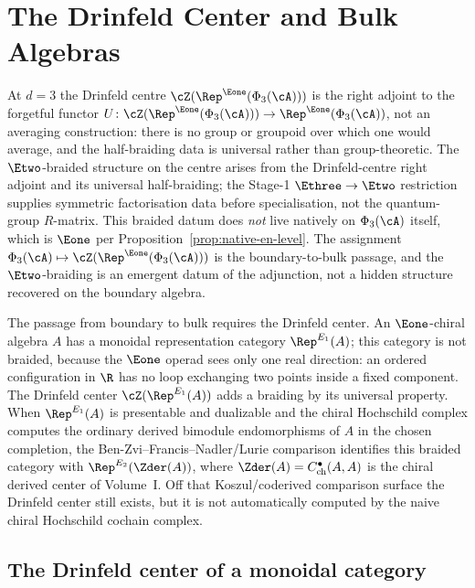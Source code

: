 \chapter{The Drinfeld Center and Bulk Algebras}
\label{ch:drinfeld-center}

\begin{remark}[Drinfeld centre at \texorpdfstring{$d=3$}{d=3}: right adjoint, not averaging]
\label{rem:drinfeld-centre-right-adjoint-not-averaging}
At $d = 3$ the Drinfeld centre $\cZ(\Rep^{\Eone}(\Phi_3(\cA)))$ is the right
adjoint to the forgetful functor
$U \colon \cZ(\Rep^{\Eone}(\Phi_3(\cA))) \to \Rep^{\Eone}(\Phi_3(\cA))$, not an
averaging construction: there is no group or groupoid over which one
would average, and the half-braiding data is universal rather than
group-theoretic. The $\Etwo$-braided structure on the centre arises
from the Drinfeld-centre right adjoint and its universal half-braiding;
the Stage-1 $\Ethree\to\Etwo$ restriction supplies symmetric
factorisation data before specialisation, not the quantum-group
$R$-matrix. This braided datum does \emph{not} live natively on $\Phi_3(\cA)$ itself,
which is $\Eone$ per Proposition~\ref{prop:native-en-level}. The
assignment $\Phi_3(\cA) \mapsto \cZ(\Rep^{\Eone}(\Phi_3(\cA)))$ is the
boundary-to-bulk passage, and the $\Etwo$-braiding is an emergent
datum of the adjunction, not a hidden structure recovered on the
boundary algebra.
\end{remark}

The passage from boundary to bulk requires the Drinfeld center.
An $\Eone$-chiral algebra $A$ has a monoidal representation category
$\Rep^{E_1}(A)$; this category is not braided, because the $\Eone$
operad sees only one real direction: an ordered configuration in
$\R$ has no loop exchanging two points inside a fixed component. The
Drinfeld center $\cZ(\Rep^{E_1}(A))$
adds a braiding by its universal property. When $\Rep^{E_1}(A)$ is presentable
and dualizable and the chiral Hochschild complex computes the
ordinary derived bimodule endomorphisms of $A$ in the chosen
completion, the Ben-Zvi--Francis--Nadler/Lurie comparison identifies
this braided category with $\Rep^{E_2}(\Zder(A))$, where
$\Zder(A)=C^\bullet_{\mathrm{ch}}(A,A)$ is the chiral derived center
of Volume~I. Off that Koszul/coderived comparison surface the
Drinfeld center still exists, but it is not automatically computed by
the naive chiral Hochschild cochain complex.


\section{The Drinfeld center of a monoidal category}
\label{sec:drinfeld-center-def}

